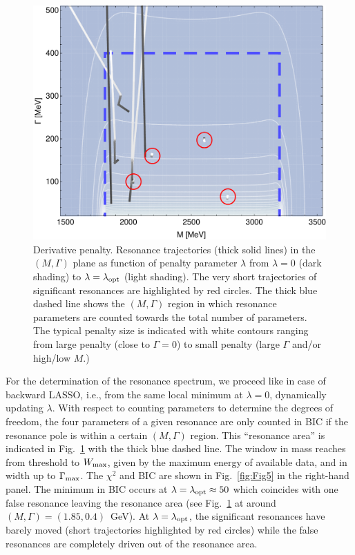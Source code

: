 \documentclass[10pt,aps,prc,superscriptaddress,twoside,twocolumn,nofootinbib,showpacs,preprintnumbers]{revtex4-1}
\begin{document}
\begin{figure}
\begin{center}
\includegraphics[width=.99\linewidth]{pic2new.pdf}
\caption{Derivative penalty. Resonance trajectories (thick solid lines) in the $(M,\Gamma)$ plane as function of penalty parameter $\lambda$ from $\lambda=0$ (dark shading) to $\lambda=\lambda_{\rm opt}$ (light shading). The very short trajectories of significant resonances are highlighted by red circles. The thick blue dashed line shows the $(M,\Gamma)$ region in which resonance parameters are counted towards the total number of parameters. The typical penalty size is indicated with white contours ranging from large penalty (close to $\Gamma=0$) to small penalty (large $\Gamma$ and/or high/low $M$.)
}
\label{fig:trajectories}
\end{center}
\end{figure}

For the determination of the resonance spectrum, we proceed like in case of backward LASSO, i.e., from the same local minimum at $\lambda=0$, dynamically updating $\lambda$. With respect to counting parameters to determine the degrees of freedom, the four parameters of a given resonance are only counted in BIC if the resonance pole is within a certain $(M,\Gamma)$ region. This ``resonance area'' is indicated in Fig.~\ref{fig:trajectories} with the thick blue dashed line. The window in mass reaches from threshold to $W_{\rm max}$, given by the maximum energy of available data, and in width up to $\Gamma_{\rm max}$. The $\chi^2$ and BIC are shown in Fig.~\ref{fig:Fig5} in the right-hand panel. The minimum in BIC occurs at $\lambda=\lambda_{\rm opt}\approx 50$ which coincides with one false resonance leaving the resonance area (see Fig.~\ref{fig:trajectories} at around $(M,\Gamma)=(1.85,0.4)$~GeV). At $\lambda=\lambda_{\rm opt}$, the significant resonances have barely moved (short trajectories highlighted by red circles) while the false resonances are completely driven out of the resonance area.
\end{document}
